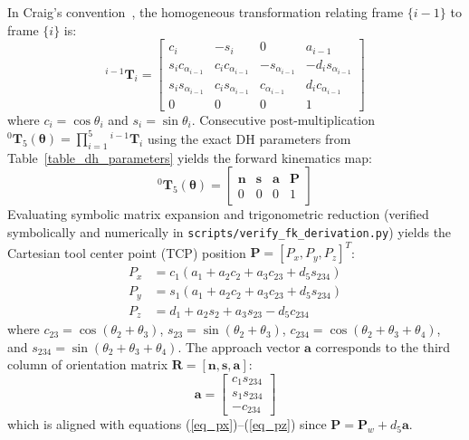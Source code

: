 \documentclass[journal]{IEEEtran}
\begin{document}
In Craig's convention~\cite{craig2005introduction}, the homogeneous transformation relating frame $\{i-1\}$ to frame $\{i\}$ is:
\begin{equation}
{}^{i-1}\mathbf{T}_i = \left[\begin{array}{cccc}
c_i & -s_i & 0 & a_{i-1} \\
s_i c_{\alpha_{i-1}} & c_i c_{\alpha_{i-1}} & -s_{\alpha_{i-1}} & -d_i s_{\alpha_{i-1}} \\
s_i s_{\alpha_{i-1}} & c_i s_{\alpha_{i-1}} & c_{\alpha_{i-1}} & d_i c_{\alpha_{i-1}} \\
0 & 0 & 0 & 1
\end{array}\right]
\end{equation}
where $c_i = \cos\theta_i$ and $s_i = \sin\theta_i$. Consecutive post-multiplication ${}^0\mathbf{T}_5(\boldsymbol{\theta}) = \prod_{i=1}^5 {}^{i-1}\mathbf{T}_i$ using the exact DH parameters from Table~\ref{table_dh_parameters} yields the forward kinematics map:
\begin{equation}
{}^0\mathbf{T}_5(\boldsymbol{\theta}) = \begin{bmatrix}
\mathbf{n} & \mathbf{s} & \mathbf{a} & \mathbf{P} \\
0 & 0 & 0 & 1
\end{bmatrix}
\end{equation}
Evaluating symbolic matrix expansion and trigonometric reduction (verified symbolically and numerically in \texttt{scripts/verify\_fk\_derivation.py}) yields the Cartesian tool center point (TCP) position $\mathbf{P} = [P_x, P_y, P_z]^T$:
\begin{align}
P_x &= c_1 \left( a_1 + a_2 c_2 + a_3 c_{23} + d_5 s_{234} \right) \label{eq_px} \\
P_y &= s_1 \left( a_1 + a_2 c_2 + a_3 c_{23} + d_5 s_{234} \right) \label{eq_py} \\
P_z &= d_1 + a_2 s_2 + a_3 s_{23} - d_5 c_{234} \label{eq_pz}
\end{align}
where $c_{23} = \cos(\theta_2+\theta_3)$, $s_{23} = \sin(\theta_2+\theta_3)$, $c_{234} = \cos(\theta_2+\theta_3+\theta_4)$, and $s_{234} = \sin(\theta_2+\theta_3+\theta_4)$. The approach vector $\mathbf{a}$ corresponds to the third column of orientation matrix $\mathbf{R} = [\mathbf{n}, \mathbf{s}, \mathbf{a}]$:
\begin{equation}
\label{eq_approach_vector}
\mathbf{a} = \begin{bmatrix} c_1 s_{234} \\ s_1 s_{234} \\ -c_{234} \end{bmatrix}
\end{equation}
which is aligned with equations (\ref{eq_px})--(\ref{eq_pz}) since $\mathbf{P} = \mathbf{P}_w + d_5 \mathbf{a}$.
\end{document}

